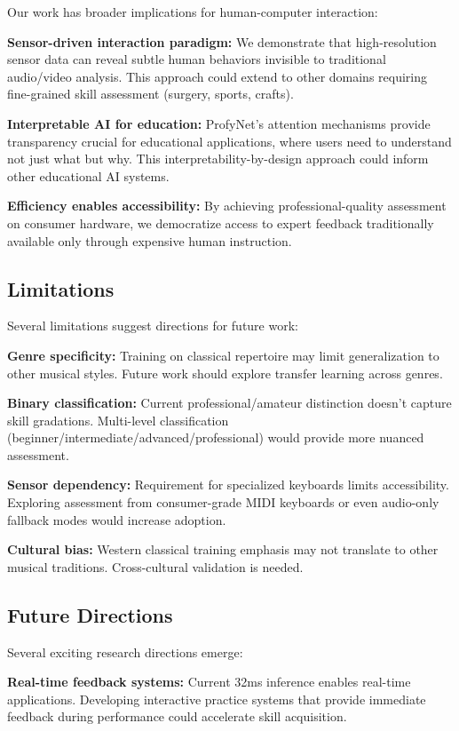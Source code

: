 Our work has broader implications for human-computer interaction:

\textbf{Sensor-driven interaction paradigm:} We demonstrate that high-resolution sensor data can reveal subtle human behaviors invisible to traditional audio/video analysis. This approach could extend to other domains requiring fine-grained skill assessment (surgery, sports, crafts).

\textbf{Interpretable AI for education:} ProfyNet's attention mechanisms provide transparency crucial for educational applications, where users need to understand not just what but why. This interpretability-by-design approach could inform other educational AI systems.

\textbf{Efficiency enables accessibility:} By achieving professional-quality assessment on consumer hardware, we democratize access to expert feedback traditionally available only through expensive human instruction.

\subsection{Limitations}

Several limitations suggest directions for future work:

\textbf{Genre specificity:} Training on classical repertoire may limit generalization to other musical styles. Future work should explore transfer learning across genres.

\textbf{Binary classification:} Current professional/amateur distinction doesn't capture skill gradations. Multi-level classification (beginner/intermediate/advanced/professional) would provide more nuanced assessment.

\textbf{Sensor dependency:} Requirement for specialized keyboards limits accessibility. Exploring assessment from consumer-grade MIDI keyboards or even audio-only fallback modes would increase adoption.

\textbf{Cultural bias:} Western classical training emphasis may not translate to other musical traditions. Cross-cultural validation is needed.

\subsection{Future Directions}

Several exciting research directions emerge:

\textbf{Real-time feedback systems:} Current 32ms inference enables real-time applications. Developing interactive practice systems that provide immediate feedback during performance could accelerate skill acquisition.

